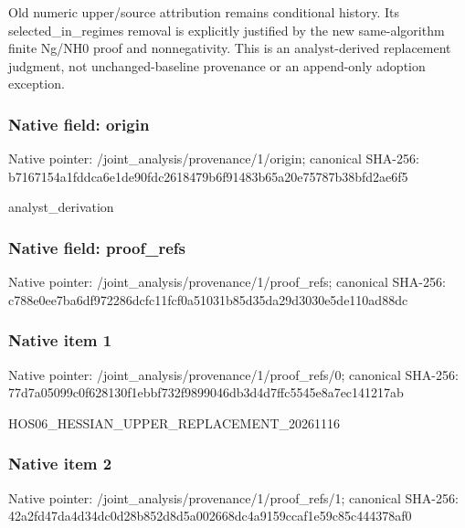 \documentclass[10pt,a4paper]{article}
\begin{document}
\begingroup\raggedright\sloppy Old numeric upper/\allowbreak{}source attribution remains conditional history. Its selected\_\allowbreak{}in\_\allowbreak{}regimes removal is explicitly justified by the new same-algorithm finite Ng/\allowbreak{}NH0 proof and nonnegativity. This is an analyst-derived replacement judgment,\allowbreak{} not unchanged-baseline provenance or an append-only adoption exception.\par\endgroup

\subsubsection{Native field: origin}
Native pointer: /joint\_\allowbreak{}analysis/provenance/1/origin; canonical SHA-256: b7167154a1fddca6e1de90fdc2618479b6f91483b65a20e75787b38bfd2ae6f5

\begingroup\raggedright\sloppy analyst\_\allowbreak{}derivation\par\endgroup

\subsubsection{Native field: proof\_\allowbreak{}refs}
Native pointer: /joint\_\allowbreak{}analysis/provenance/1/proof\_\allowbreak{}refs; canonical SHA-256: c788e0ee7ba6df972286dcfc11fcf0a51031b85d35da29d3030e5de110ad88dc

\subsubsection{Native item 1}
Native pointer: /joint\_\allowbreak{}analysis/provenance/1/proof\_\allowbreak{}refs/0; canonical SHA-256: 77d7a05099c0f628130f1ebbf732f9899046db3d4d7ffc5545e8a7ec141217ab

\begingroup\raggedright\sloppy HOS06\_\allowbreak{}HESSIAN\_\allowbreak{}UPPER\_\allowbreak{}REPLACEMENT\_\allowbreak{}20261116\par\endgroup

\subsubsection{Native item 2}
Native pointer: /joint\_\allowbreak{}analysis/provenance/1/proof\_\allowbreak{}refs/1; canonical SHA-256: 42a2fd47da4d34dc0d28b852d8d5a002668dc4a9159ccaf1e59c85c444378af0
\end{document}
